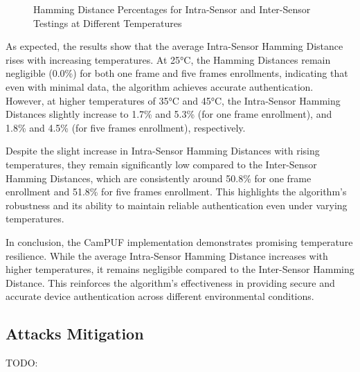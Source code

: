 \begin{figure}[h!]
	\centering
	\caption{Hamming Distance Percentages for Intra-Sensor and Inter-Sensor Testings at Different Temperatures}
	\label{fig:temperature_graph}
\end{figure}

As expected, the results show that the average Intra-Sensor Hamming Distance rises with increasing temperatures. At 25°C, the Hamming Distances remain negligible (0.0\%) for both one frame and five frames enrollments, indicating that even with minimal data, the algorithm achieves accurate authentication. However, at higher temperatures of 35°C and 45°C, the Intra-Sensor Hamming Distances slightly increase to 1.7\% and 5.3\% (for one frame enrollment), and 1.8\% and 4.5\% (for five frames enrollment), respectively.

Despite the slight increase in Intra-Sensor Hamming Distances with rising temperatures, they remain significantly low compared to the Inter-Sensor Hamming Distances, which are consistently around 50.8\% for one frame enrollment and 51.8\% for five frames enrollment. This highlights the algorithm's robustness and its ability to maintain reliable authentication even under varying temperatures.

In conclusion, the CamPUF implementation demonstrates promising temperature resilience. While the average Intra-Sensor Hamming Distance increases with higher temperatures, it remains negligible compared to the Inter-Sensor Hamming Distance. This reinforces the algorithm's effectiveness in providing secure and accurate device authentication across different environmental conditions.

\subsection{Attacks Mitigation}
TODO:

